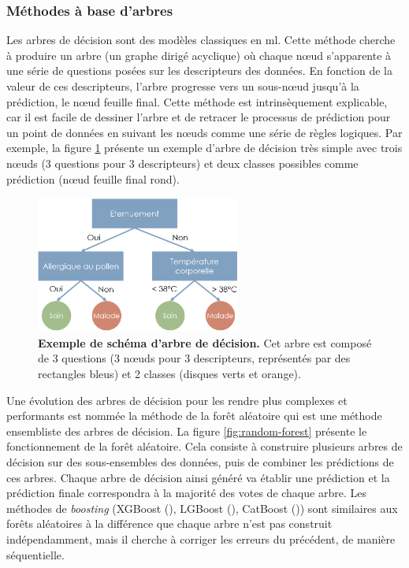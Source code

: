 \subsubsection{Méthodes à base d'arbres}
Les arbres de décision sont des modèles classiques en \gls{ml}. Cette méthode cherche à produire un arbre (un graphe dirigé acyclique) où chaque nœud s'apparente à une série de questions posées sur les descripteurs des données. En fonction de la valeur de ces descripteurs, l'arbre progresse vers un sous-nœud jusqu'à la prédiction, le nœud feuille final. Cette méthode est intrinsèquement explicable, car il est facile de dessiner l'arbre et de retracer le processus de prédiction pour un point de données en suivant les nœuds comme une série de règles logiques. Par exemple, la figure \ref{fig:decision-tree} présente un exemple d'arbre de décision très simple avec trois nœuds (3 questions pour 3 descripteurs) et deux classes possibles comme prédiction (nœud feuille final rond).

\begin{figure}[htbp]
 \centering
 \includegraphics[width=0.6\textwidth]{figures/decision_tree.png}
 \caption[Exemple de schéma d'arbre de décision]{\textbf{Exemple de schéma d'arbre de décision.} Cet arbre est composé de 3 questions (3 nœuds pour 3 descripteurs, représentés par des rectangles bleus) et 2 classes (disques verts et orange).}
 \label{fig:decision-tree}
\end{figure}

Une évolution des arbres de décision pour les rendre plus complexes et performants est nommée la méthode de la forêt aléatoire qui est une méthode ensembliste des arbres de décision. La figure \ref{fig:random-forest} présente le fonctionnement de la forêt aléatoire. Cela consiste à construire plusieurs arbres de décision sur des sous-ensembles des données, puis de combiner les prédictions de ces arbres. Chaque arbre de décision ainsi généré va établir une prédiction et la prédiction finale correspondra à la majorité des votes de chaque arbre. Les méthodes de \textit{boosting} (XGBoost (\cite{chen_xgboost_2016}), LGBoost (\cite{ke_lightgbm_2017}), CatBoost (\cite{prokhorenkova_catboost_2019})) sont similaires aux forêts aléatoires à la différence que chaque arbre n'est pas construit indépendamment, mais il cherche à corriger les erreurs du précédent, de manière séquentielle.

